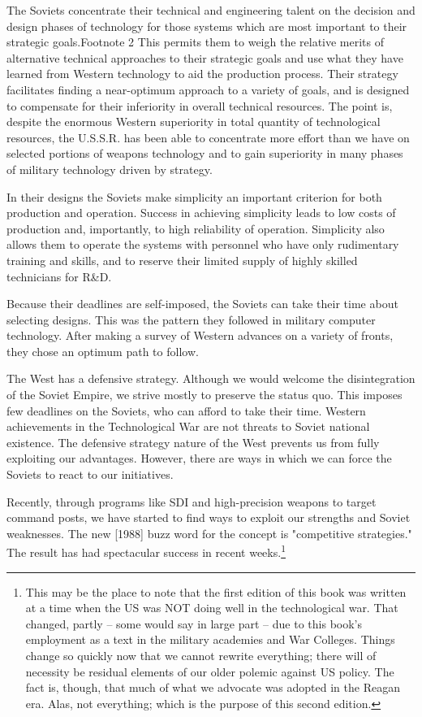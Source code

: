 \documentclass[a4paper,12pt]{book}
\begin{document}
The Soviets concentrate their technical and engineering talent on the decision and design phases of technology for those systems which are most important to their strategic goals.Footnote 2 This permits them to weigh the relative merits of alternative technical approaches to their strategic goals and use what they have learned from Western technology to aid the production process. Their strategy facilitates finding a near-optimum approach to a variety of goals, and is designed to compensate for their inferiority in overall technical resources. The point is, despite the enormous Western superiority in total quantity of technological resources, the U.S.S.R. has been able to concentrate more effort than we have on selected portions of weapons technology and to gain superiority in many phases of military technology driven by strategy.

In their designs the Soviets make simplicity an important criterion for both production and operation. Success in achieving simplicity leads to low costs of production and, importantly, to high reliability of operation. Simplicity also allows them to operate the systems with personnel who have only rudimentary training and skills, and to reserve their limited supply of highly skilled technicians for R\&D.

Because their deadlines are self-imposed, the Soviets can take their time about selecting designs. This was the pattern they followed in military computer technology. After making a survey of Western advances on a variety of fronts, they chose an optimum path to follow.

The West has a defensive strategy. Although we would welcome the disintegration of the Soviet Empire, we strive mostly to preserve the status quo. This imposes few deadlines on the Soviets, who can afford to take their time. Western achievements in the Technological War are not threats to Soviet national existence. The defensive strategy nature of the West prevents us from fully exploiting our advantages. However, there are ways in which we can force the Soviets to react to our initiatives.

Recently, through programs like SDI and high-precision weapons to target command posts, we have started to find ways to exploit our strengths and Soviet weaknesses. The new [1988] buzz word for the concept is "competitive strategies." The result has had spectacular success in recent weeks.\footnote{
This may be the place to note that the first edition of this book was written at a time when the US was NOT doing well in the technological war. That changed, partly -- some would say in large part -- due to this book's employment as a text in the military academies and War Colleges. Things change so quickly now that we cannot rewrite everything; there will of necessity be residual elements of our older polemic against US policy. The fact is, though, that much of what we advocate was adopted in the Reagan era. Alas, not everything; which is the purpose of this second edition.}
\end{document}
